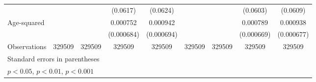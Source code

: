 \begin{table}[htbp]
\begin{tabular}{l*{8}{c}}
                         &                     &                     &    (0.0617)         &    (0.0624)         &                     &                     &    (0.0603)         &    (0.0609)         \\
[1em]
Age-squared              &                     &                     &    0.000752         &    0.000942         &                     &                     &    0.000789         &    0.000938         \\
                         &                     &                     &  (0.000684)         &  (0.000694)         &                     &                     &  (0.000669)         &  (0.000677)         \\
\hline
Observations             &      329509         &      329509         &      329509         &      329509         &      329509         &      329509         &      329509         &      329509         \\
\hline\hline
\multicolumn{9}{l}{\footnotesize Standard errors in parentheses}\\
\multicolumn{9}{l}{\footnotesize \sym{*} \(p<0.05\), \sym{**} \(p<0.01\), \sym{***} \(p<0.001\)}\\
\end{tabular}
\end{table}
